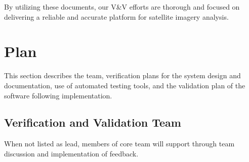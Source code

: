 \documentclass[12pt, titlepage]{article}
\begin{document}
By utilizing these documents, our V\&V efforts are thorough and focused on delivering a reliable and accurate platform for satellite imagery analysis.


\section{Plan}

This section describes the team, verification plans for the system design and documentation, use of automated testing tools, and the validation plan of the software following implementation.

\subsection{Verification and Validation Team}
When not listed as lead, members of core team will support through team discussion and implementation of feedback.\\
\end{document}

